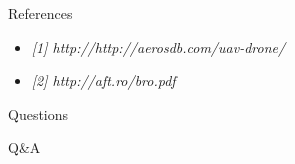 \documentclass{beamer}
\begin{document}
\begin{frame}{References}
\begin{itemize}
\item \textit{[1] http://http://aerosdb.com/uav-drone/}
\item \textit{[2] http://aft.ro/bro.pdf}
\end{itemize}
\end{frame}

\begin{frame}{Questions}
\begin{center}
\fontsize{60}{70}\selectfont Q\&A
\end{center}
\end{frame}
\end{document}
